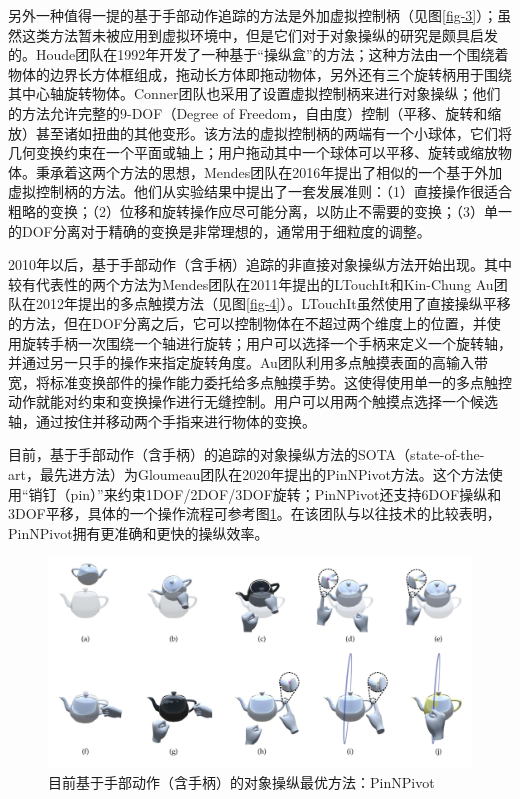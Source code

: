 另外一种值得一提的基于手部动作追踪的方法是外加虚拟控制柄（见图\ref{fig-3}）；虽然这类方法暂未被应用到虚拟环境中，但是它们对于对象操纵的研究是颇具启发的。Houde团队在1992年开发了一种基于“操纵盒”的方法；这种方法由一个围绕着物体的边界长方体框组成，拖动长方体即拖动物体，另外还有三个旋转柄用于围绕其中心轴旋转物体。Conner团队也采用了设置虚拟控制柄来进行对象操纵；他们的方法允许完整的9-DOF（Degree of Freedom，自由度）控制（平移、旋转和缩放）甚至诸如扭曲的其他变形。该方法的虚拟控制柄的两端有一个小球体，它们将几何变换约束在一个平面或轴上；用户拖动其中一个球体可以平移、旋转或缩放物体。秉承着这两个方法的思想，Mendes团队在2016年提出了相似的一个基于外加虚拟控制柄的方法。他们从实验结果中提出了一套发展准则：（1）直接操作很适合粗略的变换；（2）位移和旋转操作应尽可能分离，以防止不需要的变换；（3）单一的DOF分离对于精确的变换是非常理想的，通常用于细粒度的调整。

2010年以后，基于手部动作（含手柄）追踪的非直接对象操纵方法开始出现。其中较有代表性的两个方法为Mendes团队在2011年提出的LTouchIt和Kin-Chung Au团队在2012年提出的多点触摸方法（见图\ref{fig-4}）。LTouchIt虽然使用了直接操纵平移的方法，但在DOF分离之后，它可以控制物体在不超过两个维度上的位置，并使用旋转手柄一次围绕一个轴进行旋转；用户可以选择一个手柄来定义一个旋转轴，并通过另一只手的操作来指定旋转角度。Au团队利用多点触摸表面的高输入带宽，将标准变换部件的操作能力委托给多点触摸手势。这使得使用单一的多点触控动作就能对约束和变换操作进行无缝控制。用户可以用两个触摸点选择一个候选轴，通过按住并移动两个手指来进行物体的变换。

目前，基于手部动作（含手柄）的追踪的对象操纵方法的SOTA（state-of-the-art，最先进方法）为Gloumeau团队在2020年提出的PinNPivot方法。这个方法使用“销钉（pin）”来约束1DOF/2DOF/3DOF旋转；PinNPivot还支持6DOF操纵和3DOF平移，具体的一个操作流程可参考图\ref{fig-5}。在该团队与以往技术的比较表明，PinNPivot拥有更准确和更快的操纵效率。

\begin{figure}[t!]
    \centering
    \includegraphics[width=.99\textwidth]{figure/pinnpivot.png}
    \caption{目前基于手部动作（含手柄）的对象操纵最优方法：PinNPivot}
    \label{fig-5}
\end{figure}

